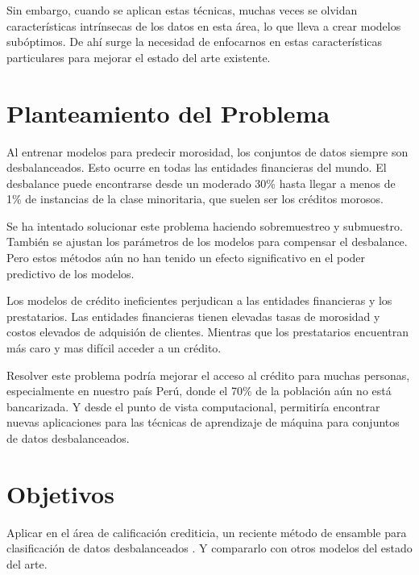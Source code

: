 Sin embargo, cuando se aplican estas técnicas, muchas veces se olvidan características intrínsecas de los datos en esta área, lo que lleva a crear modelos subóptimos. De ahí surge la necesidad de enfocarnos en estas características particulares para mejorar el estado del arte existente.

\section{Planteamiento del Problema}

Al entrenar modelos para predecir morosidad, los conjuntos de datos siempre son desbalanceados. Esto ocurre en todas las entidades financieras del mundo. El desbalance puede encontrarse desde un moderado 30\% hasta llegar a menos de 1\% de instancias de la clase minoritaria, que suelen ser los créditos morosos.

Se ha intentado solucionar este problema haciendo sobremuestreo y submuestro. También se ajustan los parámetros de los modelos para compensar el desbalance. Pero estos métodos aún no han tenido un efecto significativo en el poder predictivo de los modelos.

Los modelos de crédito ineficientes perjudican a las entidades financieras y los prestatarios. Las entidades financieras tienen elevadas tasas de morosidad y costos elevados de adquisión de clientes. Mientras que los prestatarios encuentran más caro y mas difícil acceder a un crédito.

Resolver este problema podría mejorar el acceso al crédito para muchas personas, especialmente en nuestro país Perú, donde el 70\% de la población aún no está bancarizada. Y desde el punto de vista computacional, permitiría encontrar nuevas aplicaciones para las técnicas de aprendizaje de máquina para conjuntos de datos desbalanceados.


\section{Objetivos}

Aplicar en el área de calificación crediticia, un reciente método de ensamble para clasificación de datos desbalanceados \citep{sun2015novel}. Y compararlo con otros modelos del estado del arte.



